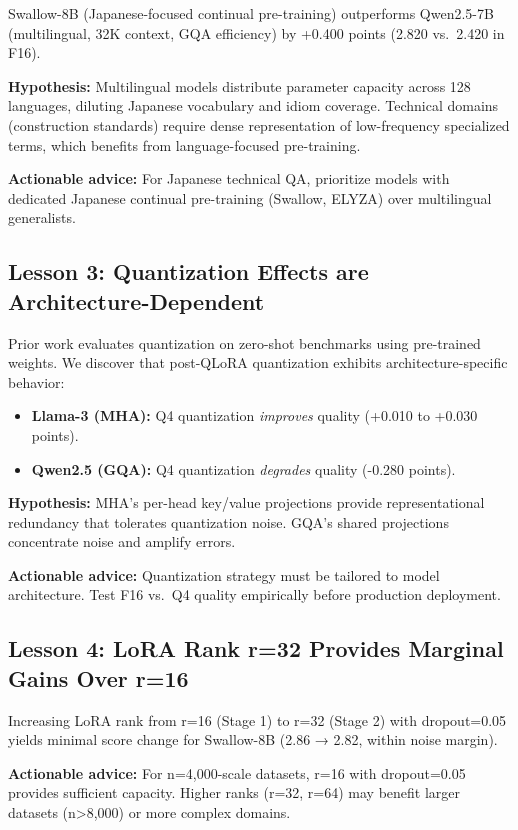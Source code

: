 \documentclass[twocolumn]{article}
\begin{document}
Swallow-8B (Japanese-focused continual pre-training) outperforms Qwen2.5-7B
(multilingual, 32K context, GQA efficiency) by +0.400 points (2.820 vs.\ 2.420 in F16).

\textbf{Hypothesis:} Multilingual models distribute parameter capacity across 128 languages,
diluting Japanese vocabulary and idiom coverage. Technical domains (construction standards)
require dense representation of low-frequency specialized terms, which benefits from
language-focused pre-training.

\textbf{Actionable advice:} For Japanese technical QA, prioritize models with dedicated
Japanese continual pre-training (Swallow, ELYZA) over multilingual generalists.

\subsection{Lesson 3: Quantization Effects are Architecture-Dependent}

Prior work evaluates quantization on zero-shot benchmarks using pre-trained weights.
We discover that post-QLoRA quantization exhibits architecture-specific behavior:
\begin{itemize}
  \item \textbf{Llama-3 (MHA):} Q4 quantization \emph{improves} quality (+0.010 to +0.030 points).
  \item \textbf{Qwen2.5 (GQA):} Q4 quantization \emph{degrades} quality (-0.280 points).
\end{itemize}

\textbf{Hypothesis:} MHA's per-head key/value projections provide representational redundancy
that tolerates quantization noise. GQA's shared projections concentrate noise and amplify
errors.

\textbf{Actionable advice:} Quantization strategy must be tailored to model architecture.
Test F16 vs.\ Q4 quality empirically before production deployment.

\subsection{Lesson 4: LoRA Rank r=32 Provides Marginal Gains Over r=16}

Increasing LoRA rank from r=16 (Stage 1) to r=32 (Stage 2) with dropout=0.05 yields minimal
score change for Swallow-8B (2.86 → 2.82, within noise margin).

\textbf{Actionable advice:} For n=4,000-scale datasets, r=16 with dropout=0.05 provides
sufficient capacity. Higher ranks (r=32, r=64) may benefit larger datasets (n>8,000)
or more complex domains.
\end{document}
